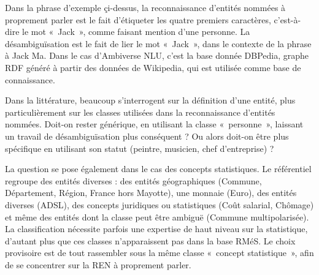\vspace{10pt}

Dans la phrase d'exemple çi-dessus, la reconnaissance d'entités nommées à proprement parler est le fait d'étiqueter les quatre premiers caractères, c'est-à-dire le mot «~Jack~», comme faisant mention d'une personne. La désambiguïsation est le fait de lier le mot «~Jack~», dans le contexte de la phrase à Jack Ma. Dans le cas d'Ambiverse NLU, c'est la base donnée DBPedia, graphe RDF généré à partir des données de Wikipedia, qui est utilisée comme base de connaissance.
\newline

Dans la littérature, beaucoup s'interrogent sur la définition d'une entité, plus particulièrement sur les classes utilisées dans la reconnaissance d'entités nommées. Doit-on rester générique, en utilisant la classe «~personne~», laissant un travail de désambiguïsation plus conséquent ? Ou alors doit-on être plus spécifique en utilisant son statut (peintre, musicien, chef d'entreprise) ?

La question se pose également dans le cas des concepts statistiques. Le référentiel regroupe des entités diverses : des entités géographiques (Commune, Département, Région, France hors Mayotte), une monnaie (Euro), des entités diverses (ADSL), des concepts juridiques ou statistiques (Coût salarial, Chômage) et même des entités dont la classe peut être ambiguë (Commune multipolarisée). La classification nécessite parfois une expertise de haut niveau sur la statistique, d'autant plus que ces classes n'apparaissent pas dans la base RMéS. Le choix provisoire est de tout rassembler sous la même classe «~concept statistique~», afin de se concentrer sur la REN à proprement parler.
\label{section 2.1.2 - REN et Désambiguïsation}

